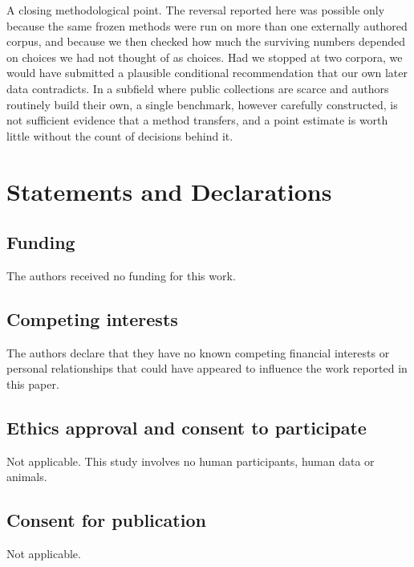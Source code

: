 \documentclass[smallextended,natbib]{svjour3}
\begin{document}
A closing methodological point. The reversal reported here was possible only because the same frozen methods were run on more than one externally authored corpus, and because we then checked how much the surviving numbers depended on choices we had not thought of as choices. Had we stopped at two corpora, we would have submitted a plausible conditional recommendation that our own later data contradicts. In a subfield where public collections are scarce and authors routinely build their own, a single benchmark, however carefully constructed, is not sufficient evidence that a method transfers, and a point estimate is worth little without the count of decisions behind it.




\section*{Statements and Declarations}

\subsection*{Funding}
The authors received no funding for this work.

\subsection*{Competing interests}
The authors declare that they have no known competing financial interests or
personal relationships that could have appeared to influence the work
reported in this paper.

\subsection*{Ethics approval and consent to participate}
Not applicable. This study involves no human participants, human data or
animals.

\subsection*{Consent for publication}
Not applicable.
\end{document}

